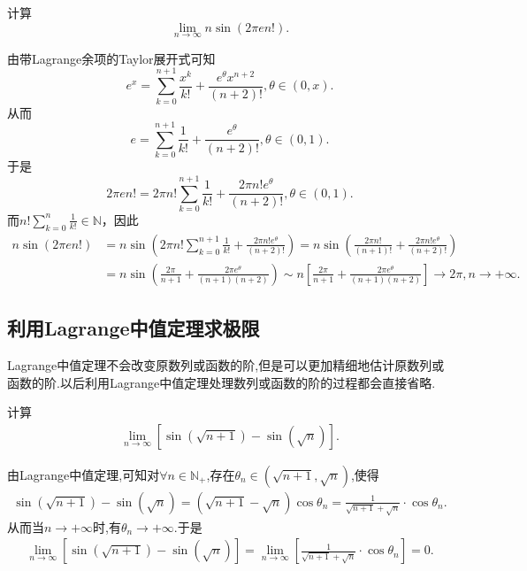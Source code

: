 \documentclass[../../main.tex]{subfiles}
\begin{document}
\begin{example}
计算
\[
\lim_{n\rightarrow \infty}n\sin(2\pi en!).
\]
\end{example}
\begin{solution}
由带Lagrange余项的Taylor展开式可知
\[
e^x = \sum_{k = 0}^{n + 1}\frac{x^k}{k!} + \frac{e^{\theta}x^{n + 2}}{(n + 2)!}, \theta \in (0, x).
\]
从而
\[
e = \sum_{k = 0}^{n + 1}\frac{1}{k!} + \frac{e^{\theta}}{(n + 2)!}, \theta \in (0, 1).
\]
于是
\[
2\pi en! = 2\pi n!\sum_{k = 0}^{n + 1}\frac{1}{k!} + \frac{2\pi n!e^{\theta}}{(n + 2)!}, \theta \in (0, 1).
\]
而\(n!\sum_{k = 0}^n\frac{1}{k!} \in \mathbb{N}\)，因此
\begin{align*}
n\sin(2\pi en!)&=n\sin\left(2\pi n!\sum_{k = 0}^{n + 1}\frac{1}{k!} + \frac{2\pi n!e^{\theta}}{(n + 2)!}\right)
=n\sin\left(\frac{2\pi n!}{(n + 1)!} + \frac{2\pi n!e^{\theta}}{(n + 2)!}\right)\\
&=n\sin\left(\frac{2\pi}{n + 1} + \frac{2\pi e^{\theta}}{(n + 1)(n + 2)}\right)
\sim n\left[\frac{2\pi}{n + 1} + \frac{2\pi e^{\theta}}{(n + 1)(n + 2)}\right] \to 2\pi, n \to +\infty.
\end{align*} 
\end{solution}


\subsection{利用Lagrange中值定理求极限}
Lagrange中值定理不会改变原数列或函数的阶,但是可以更加精细地估计原数列或函数的阶.以后利用Lagrange中值定理处理数列或函数的阶的过程都会直接省略.

\begin{example}
计算
\begin{align*}
\lim_{n \to \infty} [\sin(\sqrt{n + 1}) - \sin(\sqrt{n})].
\end{align*}
\end{example}
\begin{solution}
由Lagrange中值定理,可知对$\forall n\in\mathbb{N}_+$,存在$\theta_n \in(\sqrt{n+1},\sqrt{n})$,使得
\begin{align*}
\sin(\sqrt{n+1})-\sin(\sqrt{n})=(\sqrt{n+1}-\sqrt{n})\cos\theta_n=\frac{1}{\sqrt{n+1}+\sqrt{n}}\cdot \cos\theta_n.
\end{align*}
从而当$n\to +\infty$时,有$\theta_n \to +\infty$.于是
\begin{align*}
\lim_{n \to \infty} [\sin(\sqrt{n + 1}) - \sin(\sqrt{n})]=\lim_{n \to \infty} [\frac{1}{\sqrt{n+1}+\sqrt{n}}\cdot \cos\theta_n]=0.
\end{align*}
\end{solution}
\end{document}
